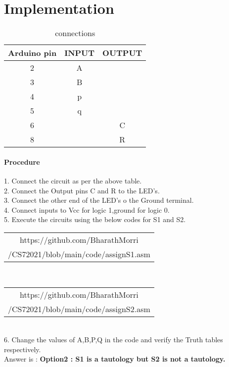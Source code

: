 \documentclass[journal,12pt,twocolumn]{IEEEtran}
\begin{document}
\section{Implementation}
\begin{table}[h]
  \centering
  \caption{connections}
  \begin{tabular}{|c|c|c|}
\hline
Arduino pin & INPUT & OUTPUT\\
\hline
2 & A &\\
\hline
3 & B &\\
\hline
4 & p &\\
\hline
5 & q &\\
\hline
6 & & C\\
\hline
8 & & R\\
\hline
  \end{tabular}
\end{table}
\paragraph{Procedure}
   1. Connect the circuit as per the above table.\\
   2. Connect the Output pins C and R to the LED's.\\
   3. Connect the other end of the LED's o the Ground terminal.\\
   4. Connect inputs to Vcc for logic 1,ground for logic 0.\\
   5. Execute the circuits using the below codes for S1 and S2.
   \begin{table}[h]
    \centering
    \begin{tabular}{|c|}
    \hline
    https://github.com/BharathMorri\\
	    /CS72021/blob/main/code/assignS1.asm\\
    \hline
    \end{tabular}
   \end{table}\\
   \begin{table}[h]
    \centering
    \begin{tabular}{|c|}
    \hline
    https://github.com/BharathMorri\\
	    /CS72021/blob/main/code/assignS2.asm\\
    \hline
    \end{tabular}
   \end{table}\\
   6. Change the values of A,B,P,Q in the code and verify the Truth tables respectively.\\
   Answer is :
   \textbf{Option2 : S1 is a tautology but S2 is not a tautology.}

\end{document}
